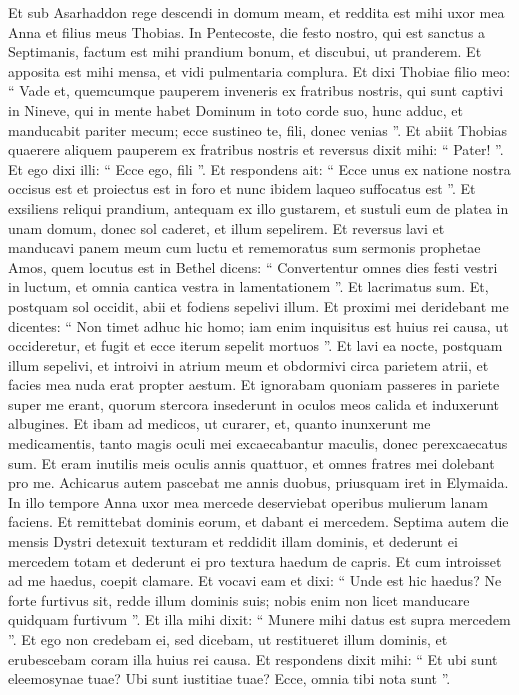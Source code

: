 \begin{biblechapter}
\begin{biblechapter}
\verse Et sub Asarhaddon rege descendi in domum meam, et reddita est mihi uxor mea Anna et filius meus Thobias. In Pentecoste, die festo nostro, qui est sanctus a Septimanis, factum est mihi prandium bonum, et discubui, ut pranderem. 
\verse Et apposita est mihi mensa, et vidi pulmentaria complura. Et dixi Thobiae filio meo: “ Vade et, quemcumque pauperem inveneris ex fratribus nostris, qui sunt captivi in Nineve, qui in mente habet Dominum in toto corde suo, hunc adduc, et manducabit pariter mecum; ecce sustineo te, fili, donec venias ”. 
 \verse Et abiit Thobias quaerere aliquem pauperem ex fratribus nostris et reversus dixit mihi: “ Pater! ”. Et ego dixi illi: “ Ecce ego, fili ”. Et respondens ait: “ Ecce unus ex natione nostra occisus est et proiectus est in foro et nunc ibidem laqueo suffocatus est ”. 
\verse Et exsiliens reliqui prandium, antequam ex illo gustarem, et sustuli eum de platea in unam domum, donec sol caderet, et illum sepelirem. 
\verse Et reversus lavi et manducavi panem meum cum luctu 
\verse et rememoratus sum sermonis prophetae Amos, quem locutus est in Bethel dicens:
 “ Convertentur omnes dies festi vestri in luctum,
 et omnia cantica vestra in lamentationem ”.
 \verse Et lacrimatus sum. Et, postquam sol occidit, abii et fodiens sepelivi illum. 
 \verse Et proximi mei deridebant me dicentes: “ Non timet adhuc hic homo; iam enim inquisitus est huius rei causa, ut occideretur, et fugit et ecce iterum sepelit mortuos ”. 
\verse Et lavi ea nocte, postquam illum sepelivi, et introivi in atrium meum et obdormivi circa parietem atrii, et facies mea nuda erat propter aestum. 
\verse Et ignorabam quoniam passeres in pariete super me erant, quorum stercora insederunt in oculos meos calida et induxerunt albugines. Et ibam ad medicos, ut curarer, et, quanto inunxerunt me medicamentis, tanto magis oculi mei excaecabantur maculis, donec perexcaecatus sum. Et eram inutilis meis oculis annis quattuor, et omnes fratres mei dolebant pro me. Achicarus autem pascebat me annis duobus, priusquam iret in Elymaida. 
\verse In illo tempore Anna uxor mea mercede deserviebat operibus mulierum lanam faciens. 
\verse Et remittebat dominis eorum, et dabant ei mercedem. Septima autem die mensis Dystri detexuit texturam et reddidit illam dominis, et dederunt ei mercedem totam et dederunt ei pro textura haedum de capris. 
\verse Et cum introisset ad me haedus, coepit clamare. Et vocavi eam et dixi: “ Unde est hic haedus? Ne forte furtivus sit, redde illum dominis suis; nobis enim non licet manducare quidquam furtivum ”. 
 \verse Et illa mihi dixit: “ Munere mihi datus est supra mercedem ”. Et ego non credebam ei, sed dicebam, ut restitueret illum dominis, et erubescebam coram illa huius rei causa. Et respondens dixit mihi: “ Et ubi sunt eleemosynae tuae? Ubi sunt iustitiae tuae? Ecce, omnia tibi nota sunt ”.
 

\end{biblechapter}
\end{biblechapter}
